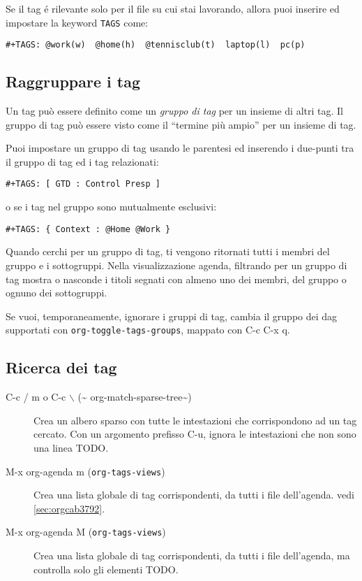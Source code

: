 \documentclass[11pt]{article}
\begin{document}
Se il tag é rilevante solo per il file su cui stai lavorando, allora
puoi inserire ed impostare la keyword \texttt{TAGS} come:

\begin{verbatim}
#+TAGS: @work(w)  @home(h)  @tennisclub(t)  laptop(l)  pc(p)
\end{verbatim}

\subsection*{Raggruppare i tag}
\label{sec:org44dd320}
Un tag può essere definito come un \emph{gruppo di tag} per un insieme di
altri tag. Il gruppo di tag può essere visto come il ``termine più
ampio'' per un insieme di tag.

Puoi impostare un gruppo di tag usando le parentesi ed inserendo i
due-punti tra il gruppo di tag ed i tag relazionati:

\begin{verbatim}
#+TAGS: [ GTD : Control Presp ]
\end{verbatim}


o se i tag nel gruppo sono mutualmente esclusivi:

\begin{verbatim}
#+TAGS: { Context : @Home @Work }
\end{verbatim}


Quando cerchi per un gruppo di tag, ti vengono ritornati tutti i membri del gruppo e i
sottogruppi. Nella visualizzazione agenda, filtrando per un gruppo di tag mostra o nasconde i titoli
segnati con almeno uno dei membri, del gruppo o ognuno dei sottogruppi.

Se vuoi, temporaneamente, ignorare i gruppi di tag, cambia il gruppo
dei dag supportati con \texttt{org-toggle-tags-groups}, mappato con
C-c C-x q.

\subsection*{Ricerca dei tag}
\label{sec:org40328a4}
\begin{description}
\item[{C-c / m o C-c $\backslash$ (\textasciitilde{} org-match-sparse-tree\textasciitilde{})}] Crea un albero sparso con tutte le intestazioni che corrispondono ad
un tag cercato. Con un argomento prefisso C-u, ignora le
intestazioni che non sono una linea TODO.

\item[{M-x org-agenda m (\texttt{org-tags-views})}] Crea una lista globale di tag corrispondenti, da tutti i file
dell'agenda. vedi \ref{sec:orgcab3792}.

\item[{M-x org-agenda M (\texttt{org-tags-views})}] Crea una lista globale di tag corrispondenti, da tutti i file
dell'agenda, ma controlla solo gli elementi TODO.
\end{description}
\end{document}
